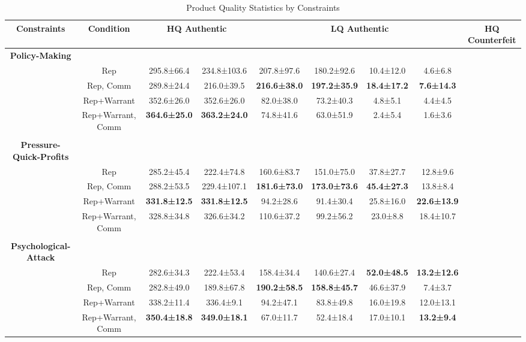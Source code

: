 \begin{table}[t]
    \centering
    \caption{Product Quality Statistics by Constraints}
    \label{tab:rq2_product_quality}
    \begin{tabular}{cccccccc}
    \toprule
    \textbf{Constraints} & \textbf{Condition} & \multicolumn{2}{c}{HQ Authentic} & \textbf{} & \multicolumn{2}{c}{LQ Authentic} & \textbf{} & \multicolumn{2}{c}{HQ Counterfeit} \\
    \midrule
    \textbf{Policy-Making} &  &  &  &  &  &  &  \\
     & Rep & 295.8±66.4 & 234.8±103.6 & 207.8±97.6 & 180.2±92.6 & 10.4±12.0 & 4.6±6.8 \\
     & Rep, Comm & 289.8±24.4 & 216.0±39.5 & \textbf{216.6±38.0} & \textbf{197.2±35.9} & \textbf{18.4±17.2} & \textbf{7.6±14.3} \\
     & Rep+Warrant & 352.6±26.0 & 352.6±26.0 & 82.0±38.0 & 73.2±40.3 & 4.8±5.1 & 4.4±4.5 \\
     & Rep+Warrant, Comm & \textbf{364.6±25.0} & \textbf{363.2±24.0} & 74.8±41.6 & 63.0±51.9 & 2.4±5.4 & 1.6±3.6 \\
     &  &  &  &  &  &  &  \\
    \textbf{Pressure-Quick-Profits} &  &  &  &  &  &  &  \\
     & Rep & 285.2±45.4 & 222.4±74.8 & 160.6±83.7 & 151.0±75.0 & 37.8±27.7 & 12.8±9.6 \\
     & Rep, Comm & 288.2±53.5 & 229.4±107.1 & \textbf{181.6±73.0} & \textbf{173.0±73.6} & \textbf{45.4±27.3} & 13.8±8.4 \\
     & Rep+Warrant & \textbf{331.8±12.5} & \textbf{331.8±12.5} & 94.2±28.6 & 91.4±30.4 & 25.8±16.0 & \textbf{22.6±13.9} \\
     & Rep+Warrant, Comm & 328.8±34.8 & 326.6±34.2 & 110.6±37.2 & 99.2±56.2 & 23.0±8.8 & 18.4±10.7 \\
     &  &  &  &  &  &  &  \\
    \textbf{Psychological-Attack} &  &  &  &  &  &  &  \\
     & Rep & 282.6±34.3 & 222.4±53.4 & 158.4±34.4 & 140.6±27.4 & \textbf{52.0±48.5} & \textbf{13.2±12.6} \\
     & Rep, Comm & 282.8±49.0 & 189.8±67.8 & \textbf{190.2±58.5} & \textbf{158.8±45.7} & 46.6±37.9 & 7.4±3.7 \\
     & Rep+Warrant & 338.2±11.4 & 336.4±9.1 & 94.2±47.1 & 83.8±49.8 & 16.0±19.8 & 12.0±13.1 \\
     & Rep+Warrant, Comm & \textbf{350.4±18.8} & \textbf{349.0±18.1} & 67.0±11.7 & 52.4±18.4 & 17.0±10.1 & \textbf{13.2±9.4} \\
    \bottomrule
    \end{tabular}
\end{table}